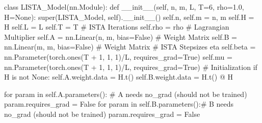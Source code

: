 \documentclass[
  letterpaper,
  DIV=11,
  numbers=noendperiod]{scrartcl}
\newenvironment{Shaded}{\begin{snugshade}}{\end{snugshade}}
\newcommand{\BuiltInTok}[1]{\textcolor[rgb]{0.40,0.85,0.94}{#1}}
\newcommand{\CommentTok}[1]{\textcolor[rgb]{0.46,0.44,0.37}{#1}}
\newcommand{\ControlFlowTok}[1]{\textcolor[rgb]{0.98,0.15,0.45}{#1}}
\newcommand{\DecValTok}[1]{\textcolor[rgb]{0.68,0.51,1.00}{#1}}
\newcommand{\FloatTok}[1]{\textcolor[rgb]{0.68,0.51,1.00}{#1}}
\newcommand{\FunctionTok}[1]{\textcolor[rgb]{0.65,0.89,0.18}{#1}}
\newcommand{\KeywordTok}[1]{\textcolor[rgb]{0.98,0.15,0.45}{#1}}
\newcommand{\NormalTok}[1]{\textcolor[rgb]{0.97,0.97,0.95}{#1}}
\newcommand{\OperatorTok}[1]{\textcolor[rgb]{0.97,0.97,0.95}{#1}}
\newcommand{\VariableTok}[1]{\textcolor[rgb]{0.97,0.97,0.95}{#1}}
\begin{document}
\begin{Shaded}
\begin{Highlighting}[]
\KeywordTok{class}\NormalTok{ LISTA\_Model(nn.Module):}
    \KeywordTok{def} \FunctionTok{\_\_init\_\_}\NormalTok{(}\VariableTok{self}\NormalTok{, n, m, L, T}\OperatorTok{=}\DecValTok{6}\NormalTok{, rho}\OperatorTok{=}\FloatTok{1.0}\NormalTok{, H}\OperatorTok{=}\VariableTok{None}\NormalTok{):}
        \BuiltInTok{super}\NormalTok{(LISTA\_Model, }\VariableTok{self}\NormalTok{).}\FunctionTok{\_\_init\_\_}\NormalTok{()}
        \VariableTok{self}\NormalTok{.n, }\VariableTok{self}\NormalTok{.m }\OperatorTok{=}\NormalTok{ n, m}
        \VariableTok{self}\NormalTok{.H }\OperatorTok{=}\NormalTok{ H}
        \VariableTok{self}\NormalTok{.L }\OperatorTok{=}\NormalTok{ L}
        \VariableTok{self}\NormalTok{.T }\OperatorTok{=}\NormalTok{ T  }\CommentTok{\# ISTA Iterations}
        \VariableTok{self}\NormalTok{.rho }\OperatorTok{=}\NormalTok{ rho  }\CommentTok{\# Lagrangian Multiplier}
        \VariableTok{self}\NormalTok{.A }\OperatorTok{=}\NormalTok{ nn.Linear(n, m, bias}\OperatorTok{=}\VariableTok{False}\NormalTok{)  }\CommentTok{\# Weight Matrix}
        \VariableTok{self}\NormalTok{.B }\OperatorTok{=}\NormalTok{ nn.Linear(m, m, bias}\OperatorTok{=}\VariableTok{False}\NormalTok{)  }\CommentTok{\# Weight Matrix}
        \CommentTok{\# ISTA Stepsizes eta}
        \VariableTok{self}\NormalTok{.beta }\OperatorTok{=}\NormalTok{ nn.Parameter(torch.ones(T }\OperatorTok{+} \DecValTok{1}\NormalTok{, }\DecValTok{1}\NormalTok{, }\DecValTok{1}\NormalTok{)}\OperatorTok{/}\NormalTok{L, requires\_grad}\OperatorTok{=}\VariableTok{True}\NormalTok{)}
        \VariableTok{self}\NormalTok{.mu }\OperatorTok{=}\NormalTok{ nn.Parameter(torch.ones(T }\OperatorTok{+} \DecValTok{1}\NormalTok{, }\DecValTok{1}\NormalTok{, }\DecValTok{1}\NormalTok{)}\OperatorTok{/}\NormalTok{L, requires\_grad}\OperatorTok{=}\VariableTok{True}\NormalTok{)}
        \CommentTok{\# Initialization}
        \ControlFlowTok{if}\NormalTok{ H }\KeywordTok{is} \KeywordTok{not} \VariableTok{None}\NormalTok{:}
            \VariableTok{self}\NormalTok{.A.weight.data }\OperatorTok{=}\NormalTok{ H.t()}
            \VariableTok{self}\NormalTok{.B.weight.data }\OperatorTok{=}\NormalTok{ H.t() }\OperatorTok{@}\NormalTok{ H}

        \CommentTok{\textquotesingle{}\textquotesingle{}\textquotesingle{}for param in self.A.parameters(): \# A needs no\_grad (should not be trained)}
\CommentTok{            param.requires\_grad = False}
\CommentTok{        for param in self.B.parameters():\# B needs no\_grad (should not be trained)}
\CommentTok{            param.requires\_grad = False\textquotesingle{}\textquotesingle{}\textquotesingle{}}
       

\end{Highlighting}
\end{Shaded}
\end{document}
